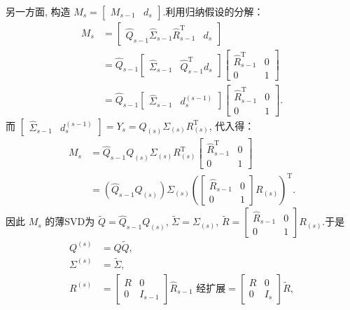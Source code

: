 另一方面, 构造 $M_s = \begin{bmatrix} M_{s-1} & d_s \end{bmatrix}$.利用归纳假设的分解：
\begin{align}
M_s &= \begin{bmatrix} \widehat Q_{s-1}\widehat\Sigma_{s-1}\widehat R_{s-1}^{\mathrm T} & d_s \end{bmatrix} \\
&= \widehat Q_{s-1} \begin{bmatrix} \widehat\Sigma_{s-1} & \widehat Q_{s-1}^{\mathrm T} d_s \end{bmatrix} \begin{bmatrix} \widehat R_{s-1}^{\mathrm T} & 0 \\ 0 & 1 \end{bmatrix} \\
&= \widehat Q_{s-1} \begin{bmatrix} \widehat\Sigma_{s-1} & d_s^{(s-1)} \end{bmatrix} \begin{bmatrix} \widehat R_{s-1}^{\mathrm T} & 0 \\ 0 & 1 \end{bmatrix}.
\end{align}
而 $\begin{bmatrix} \widehat\Sigma_{s-1} & d_s^{(s-1)} \end{bmatrix} = Y_s = Q_{(s)}\Sigma_{(s)}R_{(s)}^{\mathrm T}$, 代入得：
\begin{align}
M_s &= \widehat Q_{s-1} Q_{(s)} \Sigma_{(s)} R_{(s)}^{\mathrm T} \begin{bmatrix} \widehat R_{s-1}^{\mathrm T} & 0 \\ 0 & 1 \end{bmatrix} \\
&= \left( \widehat Q_{s-1} Q_{(s)} \right) \Sigma_{(s)} \left( \begin{bmatrix} \widehat R_{s-1} & 0 \\ 0 & 1 \end{bmatrix} R_{(s)} \right)^{\mathrm T}.
\end{align}
因此 $M_s$ 的薄SVD为 $\widetilde Q = \widehat Q_{s-1} Q_{(s)}$, $\widetilde\Sigma = \Sigma_{(s)}$, $\widetilde R = \begin{bmatrix} \widehat R_{s-1} & 0 \\ 0 & 1 \end{bmatrix} R_{(s)}$.于是
\begin{align}
Q^{(s)} &= Q \widetilde Q,\\
\Sigma^{(s)} &= \widetilde\Sigma,\\
R^{(s)} &= \begin{bmatrix}R & 0\\0 & I_{s-1}\end{bmatrix} \widehat R_{s-1} \text{ 经扩展} = \begin{bmatrix}R & 0\\0 & I_s\end{bmatrix} \widetilde R,
\end{align}
